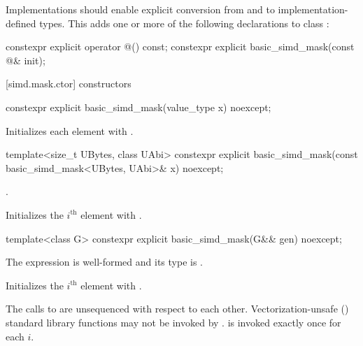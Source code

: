 \pnum
Implementations should enable explicit conversion from and to implementation-defined types. This
adds one or more of the following declarations to class :

\begin{codeblock}
constexpr explicit operator @\impdef@() const;
constexpr explicit basic_simd_mask(const @\impdef@& init);
\end{codeblock}

[simd.mask.ctor]{ constructors}

\begin{itemdecl}
constexpr explicit basic_simd_mask(value_type x) noexcept;
\end{itemdecl}

\begin{itemdescr}
  \pnum\effects
  Initializes each element with .
\end{itemdescr}

\begin{itemdecl}
template<size_t UBytes, class UAbi>
  constexpr explicit basic_simd_mask(const basic_simd_mask<UBytes, UAbi>& x) noexcept;
\end{itemdecl}

\begin{itemdescr}
  \pnum\constraints
  .

  \pnum\effects
  Initializes the $i^\text{th}$ element with  \foralli.
\end{itemdescr}

\begin{itemdecl}
template<class G> constexpr explicit basic_simd_mask(G&& gen) noexcept;
\end{itemdecl}

\begin{itemdescr}
  \pnum\constraints
  The expression  is well-formed and its type is
   \foralli.

  \pnum\effects
  Initializes the $i^\text{th}$ element with
   \foralli.

  \pnum
    The calls to  are unsequenced with respect to each other.
    Vectorization-unsafe () standard library
    functions may not be invoked by .
     is invoked exactly once for each $i$.
\end{itemdescr}

